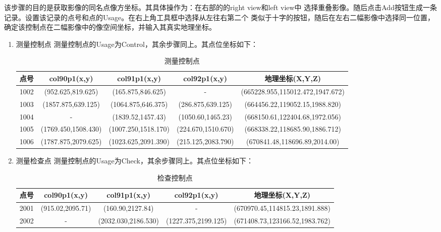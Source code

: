\begin{enumerate}
        \hspace{20pt}该步骤的目的是获取影像的同名点像方坐标。其具体操作为：在右部的的right view和left view中
        选择重叠影像。随后点击Add按钮生成一条记录。设置该记录的点号和点的Usage。在右上角工具框中选择从左往右第二个
        类似于十字的按钮，随后在左右二幅影像中选择同一位置，确定该控制点在二幅影像中的像空间坐标，并输入其真实地理坐标。

        \begin{enumerate}
            \item 测量控制点
            测量控制点的Usage为Control，其余步骤同上。其点位坐标如下：
            \begin{table}[H]
                \centering
                \begin{tabular}{ccccc}
                    \toprule
                      点号  & col90p1(x,y) & col91p1(x,y) & col92p1(x,y) & 地理坐标(X,Y,Z)  \\
                    \midrule
                        1002 & (952.625,819.625) & (165.875,846.625) & - & (665228.955,115012.472,1947.672) \\
                        1003 & (1857.875,639.125) & (1064.875,646.375) & (286.875,639.125) & (664456.22,119052.15,1988.820) \\
                        1004 & - & (1839.52,1457.43) & (1050.60,1465.23) & (668150.61,122404.68,1972.056) \\
                        1005 & (1769.450,1508.430) & (1007.250,1518.170) & (224.670,1510.670) & (668338.22,118685.90,1886.712) \\
                        1006 & (1787.875,2079.625) & (1023.625,2091.390) & (215.125,2083.790) & (670841.48,118696.89,2014.00)\\ 
                    \bottomrule
                \end{tabular}
                \caption{测量控制点}
            \end{table}

            \item 测量检查点
            测量控制点的Usage为Check，其余步骤同上。其点位坐标如下：
            \begin{table}[H]
                \centering
                \begin{tabular}{ccccc}
                    \toprule
                      点号  & col90p1(x,y) & col91p1(x,y) & col92p1(x,y) & 地理坐标(X,Y,Z)  \\
                    \midrule
                        2001 & (915.02,2095.71) & (160.90,2127.84) & - & (670970.45,114815.23,1891.888) \\
                        2002 & - & (2032.030,2186.530) & (1227.375,2199.125) & (671408.73,123166.52,1983.762) \\
                    \bottomrule
                \end{tabular}
                \caption{检查控制点}
            \end{table}


\end{enumerate}
\end{enumerate}
